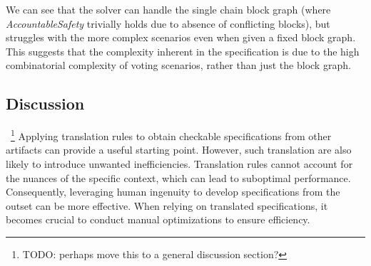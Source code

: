 We can see that the solver can handle the single chain block graph (where
\textit{AccountableSafety} trivially holds due to absence of conflicting
blocks), but struggles with the more complex scenarios even when given a fixed
block graph. This suggests that the complexity inherent in the specification is
due to the high combinatorial complexity of voting scenarios, rather than just
the block graph.

\subsection{Discussion}~\footnote{\color{red}TODO: perhaps move this to a general
discussion section?} Applying translation rules to obtain checkable
specifications from other artifacts can provide a useful starting point.
However, such translation are also likely to introduce unwanted
inefficiencies. Translation rules cannot account for the nuances of the specific
context, which can lead to suboptimal performance. Consequently, leveraging
human ingenuity to develop specifications from the outset can be more effective.
When relying on translated specifications, it becomes crucial to conduct
manual optimizations to ensure efficiency.
